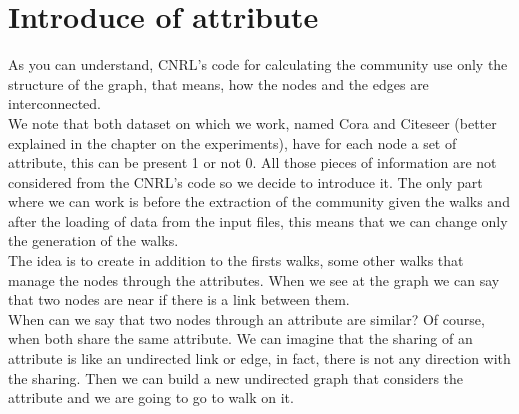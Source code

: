 \section{Introduce of attribute}
As you can understand, CNRL's code for calculating the community use only the structure of the graph, that means, how the nodes and the edges are interconnected.\\
We note that both dataset on which we work, named Cora and Citeseer (better explained in the chapter on the experiments), have for each node a set of attribute, this can be present 1 or not 0. All those pieces of information are not considered from the CNRL's code so we decide to introduce it. The only part where we can work is before the extraction of the community given the walks and after the loading of data from the input files, this means that we can change only the generation of the walks.\\
The idea is to create in addition to the firsts walks, some other walks that manage the nodes through the attributes. When we see at the graph we can say that two nodes are near if there is a link between them.\\
When can we say that two nodes through an attribute are similar? Of course, when both share the same attribute. We can imagine that the sharing of an attribute is like an undirected link or edge, in fact, there is not any direction with the sharing. Then we can build a new undirected graph that considers the attribute and we are going to go to walk on it.
%
